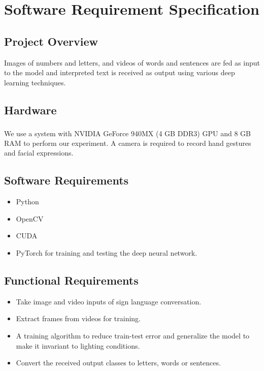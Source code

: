 \documentclass[12pt,oneside,a4paper]{article}
\begin{document}
	\section{Software Requirement Specification}

		\subsection{Project Overview}
			Images of numbers and letters, and videos of words and sentences are fed as input to the model and interpreted text is received as output using various deep learning techniques.

		\subsection{Hardware}
			We use a system with NVIDIA\textsuperscript{\textregistered} GeForce\textsuperscript{\textregistered} 940MX (4 GB DDR3) GPU and 8 GB RAM to perform our experiment. A camera is required to record hand gestures and facial expressions.

		\subsection{Software Requirements}

			\begin{itemize}
				\item Python
				\item OpenCV
				\item CUDA
				\item PyTorch for training and testing the deep neural network.
			\end{itemize}

		\subsection{Functional Requirements}

			\begin{itemize}
				\item Take image and video inputs of sign language conversation.
				\item Extract frames from videos for training.
				\item A training algorithm to reduce train-test error and generalize the model to make it invariant to lighting conditions.
				\item Convert the received output classes to letters, words or sentences.
			\end{itemize}
\end{document}
